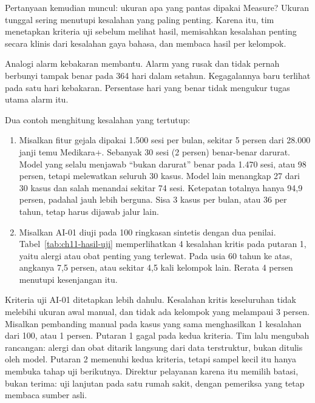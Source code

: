 Pertanyaan kemudian muncul: ukuran apa yang pantas dipakai Measure? Ukuran tunggal sering menutupi
kesalahan yang paling penting. Karena itu, tim menetapkan kriteria uji sebelum melihat hasil,
memisahkan kesalahan penting secara klinis dari kesalahan gaya bahasa, dan membaca hasil per
kelompok.

Analogi alarm kebakaran membantu. Alarm yang rusak dan tidak pernah berbunyi tampak benar pada 364
hari dalam setahun. Kegagalannya baru terlihat pada satu hari kebakaran. Persentase hari yang benar
tidak mengukur tugas utama alarm itu.

Dua contoh menghitung kesalahan yang tertutup:
\begin{enumerate}
  \item Misalkan fitur gejala dipakai 1.500 sesi per bulan, sekitar 5 persen dari 28.000 janji temu
  Medikara+. Sebanyak 30 sesi (2 persen) benar-benar darurat. Model yang selalu menjawab ``bukan
  darurat'' benar pada 1.470 sesi, atau 98 persen, tetapi melewatkan seluruh 30 kasus. Model lain
  menangkap 27 dari 30 kasus dan salah menandai sekitar 74 sesi. Ketepatan totalnya hanya 94,9
  persen, padahal jauh lebih berguna. Sisa 3 kasus per bulan, atau 36 per tahun, tetap harus dijawab
  jalur lain.
  \item Misalkan AI-01 diuji pada 100 ringkasan sintetis dengan dua penilai.
  Tabel~\ref{tab:ch11-hasil-uji} memperlihatkan 4 kesalahan kritis pada putaran 1, yaitu alergi atau
  obat penting yang terlewat. Pada usia 60 tahun ke atas, angkanya 7,5 persen, atau sekitar 4,5 kali
  kelompok lain. Rerata 4 persen menutupi kesenjangan itu.
\end{enumerate}

Kriteria uji AI-01 ditetapkan lebih dahulu. Kesalahan kritis keseluruhan tidak melebihi ukuran awal
manual, dan tidak ada kelompok yang melampaui 3 persen. Misalkan pembanding manual pada kasus yang
sama menghasilkan 1 kesalahan dari 100, atau 1 persen. Putaran 1 gagal pada kedua kriteria. Tim lalu
mengubah rancangan: alergi dan obat ditarik langsung dari data terstruktur, bukan ditulis oleh
model. Putaran 2 memenuhi kedua kriteria, tetapi sampel kecil itu hanya membuka tahap uji
berikutnya. Direktur pelayanan karena itu memilih batasi, bukan terima: uji lanjutan pada satu rumah
sakit, dengan pemeriksa yang tetap membaca sumber asli.


